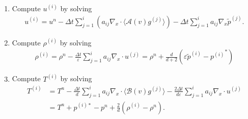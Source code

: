 \documentclass[final,11pt]{siamart251216}
\numberwithin{equation}{section}
\theoremstyle{definition}
\theoremstyle{remark}
\begin{document}
\begin{algorithm}
\begin{enumerate}
with
\begin{equation}
\begin{split}
{p^{(i)}}^* &= p^n - \Delta t  \sum_{j = 1}^i \left( a_{ij} \frac{1}{d} \nabla_x \cdot \langle \mathcal{B}(v) g^{(j)} \rangle \right), \\
{u^{(i)}}^* &= u^n - \Delta t  \sum_{j = 1}^i \left( a_{ij} \nabla_x \cdot \langle \mathcal{A}(v) g^{(j)} \rangle \right).
\end{split}
\end{equation}
\item Compute $u^{(i)}$ by solving
\begin{equation}
\begin{split}\label{ThirdStep}
{u^{(i)}} = u^n - \Delta t  \sum_{j = 1}^i \left( a_{ij} \nabla_x \cdot \langle \mathcal{A}(v) g^{(j)} \rangle \right) -\Delta t \sum_{j=1}^{i} a_{ij} \nabla_x \tilde p^{(j)}.
\end{split}
\end{equation}
\item Compute $\rho^{(i)}$ by solving
\begin{equation}
\begin{split}\label{FifthStep}
{\rho^{(i)}} =   \rho^n  - \frac{\Delta t}{\varepsilon} \sum_{j=1}^{i} a_{ij} \nabla_x \cdot u^{(j)} = \rho^n  + \frac{d}{d+2}
(\varepsilon \tilde p^{(i)} - {p^{(i)}}^* )\end{split}
\end{equation}
\item Compute $T^{(i)}$ by solving
\begin{equation}
\label{FourthStep}
\begin{split}
T^{(i)} &= T^n - \frac{\Delta t}{d} \sum_{j = 1}^i a_{ij} \nabla_x \cdot \langle \mathcal{B}(v) g^{(j)} \rangle - \frac{2 \Delta t}{d \varepsilon} \sum_{j=1}^{i} a_{ij} \nabla_x \cdot u^{(j)} \\
&= T^n + p^{(i)*} - p^n + \frac{2}{d} (\rho^{(i)} - \rho^n).
\end{split}
\end{equation}



\end{enumerate}
\end{algorithm}
\end{document}
